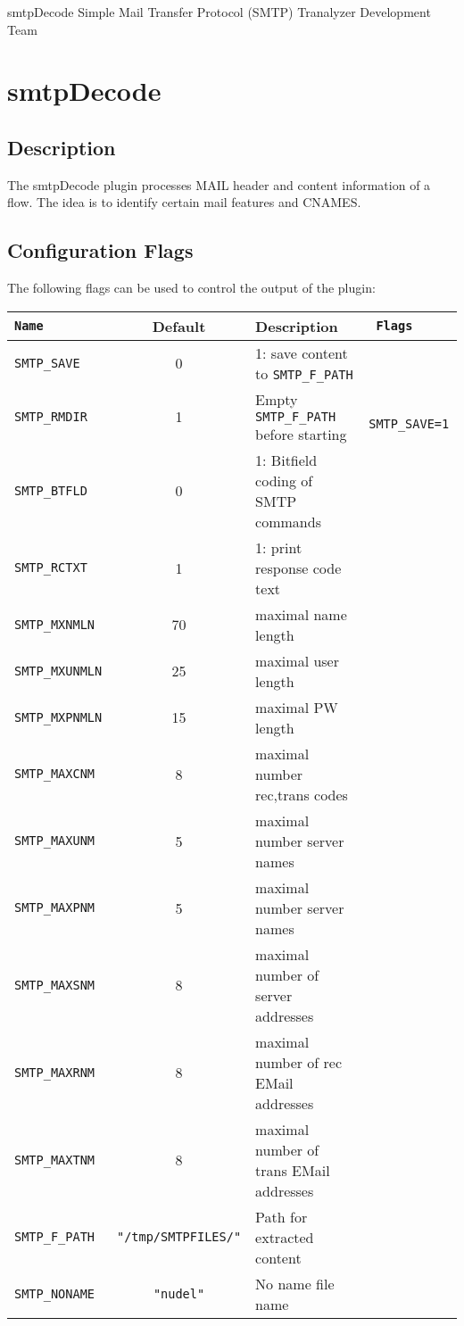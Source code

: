\documentclass[documentation]{subfiles}
\begin{document}
\trantitle
    {smtpDecode}
    {Simple Mail Transfer Protocol (SMTP)}
    {Tranalyzer Development Team}

\section{smtpDecode}\label{s:smtpDecode}

\subsection{Description}
The smtpDecode plugin processes MAIL header and content information of a flow.
The idea is to identify certain mail features and CNAMES.

\subsection{Configuration Flags}
The following flags can be used to control the output of the plugin:
\begin{longtable}{>{\tt}lcl>{\tt\small}l}
    \toprule
    {\bf Name} & {\bf Default} & {\bf Description} & {\bf Flags}\\
    \midrule\endhead%
    SMTP\_SAVE    &  0 & 1: save content to {\tt\small SMTP\_F\_PATH}    & \\
    SMTP\_RMDIR   &  1 & Empty {\tt\small SMTP\_F\_PATH} before starting & SMTP\_SAVE=1\\
    SMTP\_BTFLD   &  0 & 1: Bitfield coding of SMTP commands             & \\
    SMTP\_RCTXT   &  1 & 1: print response code text                     & \\
    SMTP\_MXNMLN  & 70 & maximal name length                             & \\
    SMTP\_MXUNMLN & 25 & maximal user length                             & \\
    SMTP\_MXPNMLN & 15 & maximal PW length                               & \\
    SMTP\_MAXCNM  &  8 & maximal number rec,trans codes                  & \\
    SMTP\_MAXUNM  &  5 & maximal number server names                     & \\
    SMTP\_MAXPNM  &  5 & maximal number server names                     & \\
    SMTP\_MAXSNM  &  8 & maximal number of server addresses              & \\
    SMTP\_MAXRNM  &  8 & maximal number of rec EMail addresses           & \\
    SMTP\_MAXTNM  &  8 & maximal number of trans EMail addresses         & \\

    SMTP\_F\_PATH & {\tt\small "/tmp/SMTPFILES/"}
                       & Path for extracted content                      & \\
    SMTP\_NONAME  & {\tt\small "nudel"}
                       & No name file name                               & \\
    \bottomrule
\end{longtable}
\end{document}
